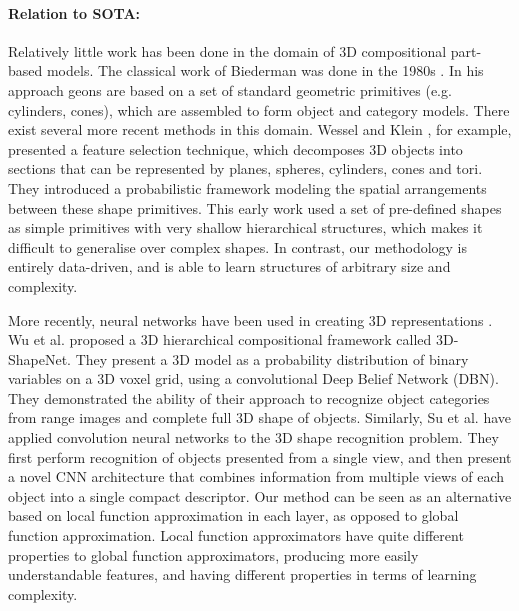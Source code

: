 \documentclass[a4paper,11pt,pdf]{../templates/pacmanreport}
\begin{document}
\paragraph{Relation to SOTA:}  

Relatively little work has been done in the domain of 3D compositional part-based models. The classical work of Biederman was done in the 1980s \cite{biederman1987recognition}. In his approach geons are based on a set of standard geometric primitives (e.g. cylinders, cones), which are assembled to form object and category models. There exist several more recent methods in this domain. Wessel and Klein \cite{pratikakis2010learning}, for example, presented a feature selection technique, which decomposes 3D objects into sections that can be represented by planes, spheres, cylinders, cones and tori. They introduced a probabilistic framework modeling the spatial arrangements between these shape primitives. This early work \cite{biederman1987recognition,pratikakis2010learning} used a set of pre-defined shapes as simple primitives with very shallow hierarchical structures, which makes it difficult to generalise over complex shapes. In contrast, our methodology is entirely data-driven, and is able to learn structures of arbitrary size and complexity. 

More recently, neural networks have been used in creating 3D representations \cite{wu20153d,Su_2015_ICCV}. Wu et al. \cite{wu20153d} proposed a 3D hierarchical compositional framework called 3D-ShapeNet. They present a 3D model
as a probability distribution of binary variables on a 3D voxel grid, using a convolutional Deep Belief Network (DBN). They demonstrated the ability of their approach to recognize object categories from range images and complete full 3D shape of objects. Similarly, Su et al. \cite{Su_2015_ICCV} have applied convolution neural networks to the 3D shape recognition problem. They first perform recognition of objects presented from a single view, and then present a novel
CNN architecture that combines information from multiple views of each object into a single compact descriptor. Our method can be seen as an alternative based on local function approximation in each layer, as opposed to global function approximation. Local function approximators have quite different properties to global function approximators, producing more easily understandable features, and having different properties in terms of learning complexity.
\end{document}
